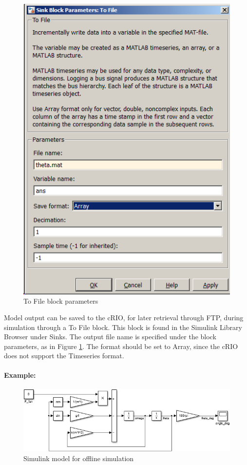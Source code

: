 \documentclass[a4paper,twoside,english]{report}
\begin{document}
\begin{figure}[!h]
\centering \includegraphics[scale=0.45]{fig/simulink_tofile} \caption{To File block parameters}

\label{fig: simulink to file} 
\end{figure}

Model output can be saved to the cRIO, for later retrieval through
FTP, during simulation through a To File block. This block is found
in the Simulink Library Browser under Sinks. The output file name
is specified under the block parameters, as in Figure \ref{fig: simulink to file}.
The format should be set to Array, since the cRIO does not support
the Timeseries format.

\paragraph{Example:}

\begin{figure}[!h]
\centering \includegraphics[scale=0.45]{fig/simulink_before} \caption{Simulink model for offline simulation}

\label{fig: Simulink pendulum model} 
\end{figure}
\end{document}
